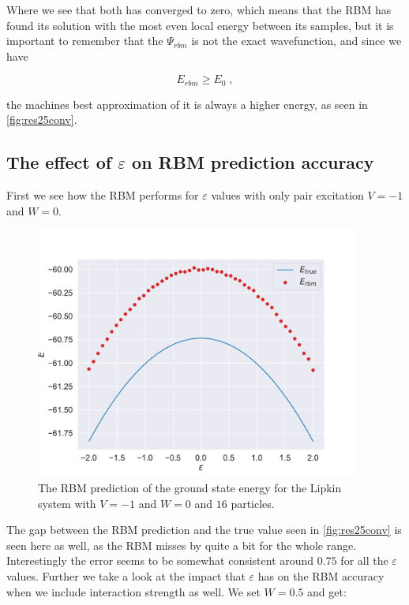 Where we see that both has converged to zero, which means that the RBM has found its solution with the most even local energy between its samples, but it is important to remember that the $\Psi_{rbm}$ is not the exact wavefunction, and since we have

$$E_{rbm} \geq E_0 \; ,$$

the machines best approximation of it is always a higher energy, as seen in \ref{fig:res25conv}.

\subsection{The effect of \texorpdfstring{$\varepsilon$}{epsilon} on RBM prediction accuracy}
First we see how the RBM performs for $\varepsilon$ values with only pair excitation $V=-1$ and $W=0$.

\begin{figure}[H]
  \begin{center}
    \includegraphics[width=0.95\textwidth]{Figures/Plots/Lipkin/val-true[eps][-2.0-2.0][e=500][n=16][V=-1][W=0].pdf}
  \end{center}
  \caption{The RBM prediction of the ground state energy for the Lipkin system with $V=-1$ and $W=0$ and $16$ particles.}
\end{figure}

The gap between the RBM prediction and the true value seen in \ref{fig:res25conv} is seen here as well, as the RBM misses by quite a bit for the whole range. Interestingly the error seems to be somewhat consistent around $0.75$ for all the $\varepsilon$ values. Further we take a look at the impact that $\varepsilon$ has on the RBM accuracy when we include interaction strength as well. We set $W=0.5$ and get:

